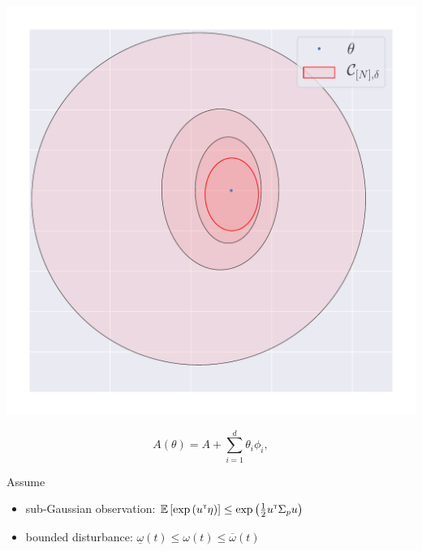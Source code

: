 \documentclass[paperwidth=36in,paperheight=48in,portrait,fontscale=0.355, margin=2cm]{baposter}
\begin{document}
\begin{poster}
{\begin{center}
	\includegraphics[trim={1cm 0 0 0}, clip, width=0.6\linewidth]{../img/ellipsoid}
\end{center}

\begin{assumption}[Structure]
	\begin{equation}
	\label{eq:structure}
	A(\theta) = A + %
	\sum_{i=1}^d \theta_i\phi_i,
	\end{equation}
\end{assumption}

\begin{assumption} Assume
	\begin{itemize}
		\item sub-Gaussian observation: $\operatorname*{\mathbb{E}} \left[ \exp{\left( u^{\mathsf{\scriptscriptstyle T}}\eta\right)}\right] \leq \exp{\left( \frac{1}{2} u^{\mathsf{\scriptscriptstyle T}}\Sigma_p u\right)}$
		\item bounded disturbance:
		$\underline\omega(t) \leq \omega(t) \leq \overline\omega(t)$
	\end{itemize}
\end{assumption}

}
\end{poster}
\end{document}
